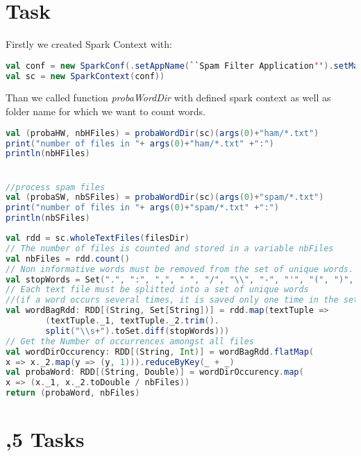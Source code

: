\documentclass[paper=a4, fontsize=11pt]{scrartcl}
\numberwithin{equation}{section}		%
\numberwithin{figure}{section}			%
\numberwithin{table}{section}				%
\begin{document}
\section{Task}
Firstly we created Spark Context with:
\begin{lstlisting}[language=scala]
val conf = new SparkConf(.setAppName(``Spam Filter Application'').setMaster(``local'')
val sc = new SparkContext(conf))
\end{lstlisting}
Than we called function \textit{probaWordDir} with defined spark context as well as folder name for which we want to count words.
\begin{lstlisting}[language=scala]
val (probaHW, nbHFiles) = probaWordDir(sc)(args(0)+"ham/*.txt")
print("number of files in "+ args(0)+"ham/*.txt" +":")
println(nbHFiles)


//process spam files
val (probaSW, nbSFiles) = probaWordDir(sc)(args(0)+"spam/*.txt")
print("number of files in "+ args(0)+"spam/*.txt" +":")
println(nbSFiles)
\end{lstlisting}
\begin{lstlisting}[language=scala]
val rdd = sc.wholeTextFiles(filesDir)
// The number of files is counted and stored in a variable nbFiles
val nbFiles = rdd.count()
// Non informative words must be removed from the set of unique words. 
val stopWords = Set(".", ":", ",", " ", "/", "\\", "-", "'", "(", ")", "@")
// Each text file must be splitted into a set of unique words 
//(if a word occurs several times, it is saved only one time in the set).
val wordBagRdd: RDD[(String, Set[String])] = rdd.map(textTuple =>
        (textTuple._1, textTuple._2.trim().
        split("\\s+").toSet.diff(stopWords)))
// Get the Number of occurrences amongst all files
val wordDirOccurency: RDD[(String, Int)] = wordBagRdd.flatMap(
x => x._2.map(y => (y, 1))).reduceByKey(_ + _)
val probaWord: RDD[(String, Double)] = wordDirOccurency.map(
x => (x._1, x._2.toDouble / nbFiles))
return (probaWord, nbFiles)

\end{lstlisting}
\section{,5 Tasks}
\end{document}

